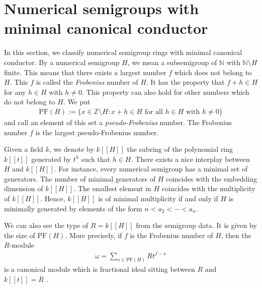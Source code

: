 \documentclass[12pt]{amsart}
\theoremstyle{definition}
\begin{document}
\section{Numerical semigroups with minimal canonical conductor}
In this section, we classify numerical semigroup rings with minimal canonical conductor. By a numerical semigroup $H$, we mean a subsemigroup of $\mathbb{N}$ with $\mathbb{N}\setminus H$ finite. This means that there exists a largest number $f$ which does not belong to $H$. This $f$ is called the \textit{Frobenius} number of $H$. It has the property that $f + h \in H$ for any $h \in H$ with $h \neq 0$. This property can also hold for other numbers which do not belong to $H$. We put 
\begin{align*}
\mathrm{PF}(H):= \{x \in \mathbb{Z} \setminus H \colon x + h \in H \text{ for all } h \in H \text{ with } h \neq 0 \}
\end{align*}
and call an element of this set a \textit{pseudo-Frobenius} number. The Frobenius number $f$ is the largest pseudo-Frobenius number.

Given a field $k$, we denote by $k[[H]]$ the subring of the polynomial ring $k[[t]]$ generated by $t^h$ such that $h \in H$. There exists a nice interplay between $H$ and $k[[H]]$. For instance, every numerical semigroup has a minimal set of generators. The number of minimal generators of $H$ coincides with the embedding dimension of $k[[H]]$. The smallest element in $H$ coincides with the multiplicity of $k[[H]]$. Hence, $k[[H]]$ is of minimal multiplicity if and only if $H$ is minimally generated by elements of the form $n< a_2< \cdots < a_n$.

We can also see the type of $R = k[[H]]$ from the semigroup data. It is given by the size of $\mathrm{PF}(H)$. More precisely, if $f$ is the Frobenius number of $H$, then the $R$-module 
\begin{align*}
\omega = \sum_{x \in \mathrm{PF}(H)} Rt^{f-x}
\end{align*}
is a canonical module which is fractional ideal sitting between $R$ and $k[[t]] = \overline{R}$ \cite[Korollar 5]{Jager}.
 
\end{document}
